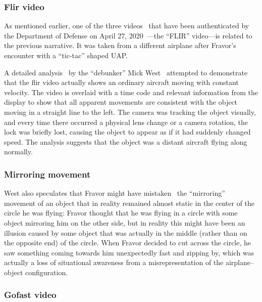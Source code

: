 \subsubsection*{Flir video}

As mentioned earlier, one of the
three videos~\cite{NAVAIRFOIAFLIR2020Apr,NAVAIRFOIAGOFAST2020Apr,NAVAIRFOIAGIMBAL2020Apr}
that have been authenticated by the Department of Defense on April 27, 2020~\cite{DOD2020}---the ``FLIR'' video---is related to the previous narrative.
It was taken from a different airplane after Fravor's encounter with a ``tic-tac'' shaped UAP.

A detailed analysis~\cite{West2022Nov,WestFlir2020May,WestFravorWest2020Sep} by the ``debunker'' Mick West~\cite{Metabunk2023Mar}  
attempted to demonstrate that the flir video actually shows an ordinary aircraft moving with constant velocity.
The video is overlaid with a time code and relevant information from the display to
show that all apparent movements are consistent with the object moving in a straight line to the left.
The camera was tracking the object visually, and every time there occurred a physical lens change or a camera rotation,
the lock was briefly lost, causing the object to appear as if it had suddenly changed speed.
The analysis suggests that the object was a distant aircraft flying along normally.

\subsubsection*{Mirroring movement}

West also speculates that Fravor might have mistaken~\cite{WestFravorWest2020Sep,WestAlexDietrich2021Jun} the ``mirroring'' movement of an object that in reality remained almost
static in the center of the circle he was flying:
Fravor thought that he was  flying in a circle with some object mirroring him on the other side,
but in reality this might have been an illusion caused by some object that was actually in the middle (rather than on the opposite end) of the circle.
When Fravor decided to cut across the circle, he saw something coming towards him unexpectedly fast and zipping by,
which was actually a loss of situational awareness from a misrepresentation of the airplane--object configuration.

\subsubsection*{Gofast video}

